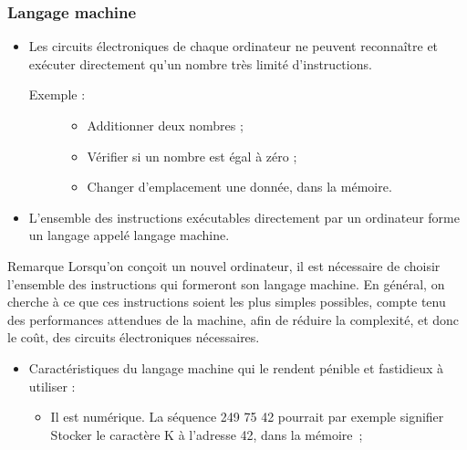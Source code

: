 \documentclass[utf8,10pt]{beamer}
\begin{document}
\begin{frame}[allowframebreaks=0.95]
    \frametitle{Langage machine}
    \begin{itemize}
        \item Les circuits électroniques de chaque ordinateur ne peuvent reconnaître et exécuter
    directement qu'un nombre très limité d'instructions.
        \begin{description}
            \item[Exemple :]
            \begin{itemize}
                \item Additionner deux nombres ;
                \item Vérifier si un nombre est égal à zéro ;
                \item Changer d'emplacement une donnée, dans la mémoire.
            \end{itemize}
        \end{description}

        \item L'ensemble des instructions exécutables \alert{directement} par un ordinateur forme
        un langage appelé \alert{langage machine}.
        \hyperlink{http://fr.wikipedia.org/wiki/Langage_machine}{}
    \end{itemize}
    
    \begin{exampleblock}{Remarque}
        Lorsqu'on conçoit un nouvel ordinateur, il est nécessaire de choisir l'ensemble des instructions
        qui formeront son langage machine.  En général, on cherche à ce que ces instructions soient les
        plus simples possibles, compte tenu des performances attendues de la machine, \alert{afin de réduire
        la complexité}, et donc le coût, des circuits électroniques nécessaires.
    \end{exampleblock}
    
    \begin{itemize}
        \item Caractéristiques du \alert{langage machine} qui le rendent pénible et fastidieux à utiliser :
        \begin{itemize}
            \item Il est \alert{numérique}. La séquence 249 75 42 pourrait par exemple signifier \og
            Stocker le caractère K à l'adresse 42, dans la mémoire\fg\ ;
            

\end{itemize}
\end{itemize}
\end{frame}
\end{document}
